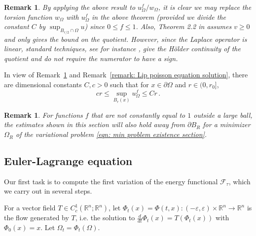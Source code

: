 \documentclass[10pt, reqno]{amsart}
\numberwithin{equation}{section}
\newtheorem{remark}[theorem]{Remark}
\def\R{{\mathbb R}}
\def\e{\varepsilon}
\def\W{\Omega}
\def\err{\tau}
\def\Ep{\mathcal{F}_{\err}}
\begin{document}
{\begin{remark} \label{r:bhpf}
\rm{
    By applying the above result to $u_{\W}^f/w_{\W}$, it is clear we may replace  the torsion function $w_{\W}$ with $u_{\W}^f$ in the above theorem (provided we divide the constant $C$ by $\sup_{B_{r/2}\cap \W} u$) since $0\leq f\leq 1$. Also, Theorem 2.2 in \cite{aks23} assumes $v \geq 0$ and only gives the bound on the quotient. However, since the Laplace operator is linear, standard techniques, see for instance \cite{ac85}, give the H\"older continuity of the quotient and do not require the numerator to have a sign. 
    }
\end{remark}}

In view of Remark~\ref{r:bhpf} and Remark~\ref{remark: Lip poisson equation solution}, there are 
dimensional constants $C, c>0$ such that
for $x \in \partial \W$ and  $r\in (0,r_0]$,
\begin{equation}
    \label{eqn: lin growth uf}
     cr \leq \sup_{B_r(x)} u_{\W}^f \leq Cr\,.
\end{equation}
\begin{remark}
    {\rm For functions $f$ that are not constantly equal to $1$ outside a large ball, the estimates shown in this section will also hold away from $\partial B_R$ for a minimizer $\W_R$ of the variational problem \eqref{eqn: min problem existence section}.
    }
\end{remark}

\subsection{Euler-Lagrange equation}
Our first task is to compute the first variation of the energy functional $\Ep$, which we carry out in several steps.

For a vector field $T \in C^1_c(\mathbb{R}^n; \R^n)$, let $\Phi_t(x) = \Phi(t,x): (-\e, \e) \times \R^n \to \R^n$ is the flow generated by $T$, i.e. the solution to $\frac{d}{dt} \Phi_t(x) = T(\Phi_t(x))$
with $\Phi_0(x) = x.$ Let $\Omega_t = \Phi_t(\Omega)$.
\end{document}
